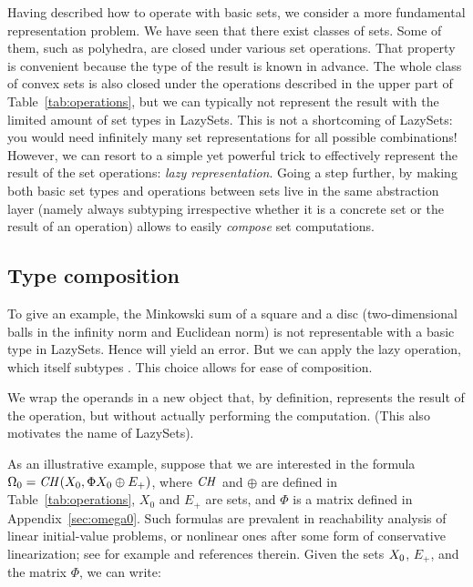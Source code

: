 Having described how to operate with basic sets, we consider a more fundamental representation problem.
%
We have seen that there exist classes of sets.
Some of them, such as polyhedra, are closed under various set operations. That property is convenient because the type of the result is known in advance.
%
The whole class of convex sets is also closed under the operations described in the upper part of Table~\ref{tab:operations}, but we can typically not represent the result with the limited amount of set types in LazySets. This is not a shortcoming of LazySets: you would need infinitely many set representations for all possible combinations! However, we can resort to a simple yet powerful trick to effectively represent the result of the set operations: \emph{lazy representation}.
%
Going a step further, by making both basic set types and operations between sets live in the same abstraction layer (namely always subtyping  irrespective whether it is a concrete set or the result of an operation) allows to easily \emph{compose} set computations.


\subsection{Type composition} \label{sec:composition}

To give an example, the Minkowski sum of a square and a disc (two-dimensional balls in the infinity norm and Euclidean norm) is not representable with a basic type in LazySets. Hence  will yield an error. But we can apply the lazy  operation, which itself subtypes . This choice allows for ease of composition.

We wrap the operands in a new object that, by definition, represents the result of the operation, but without actually performing the computation. (This also motivates the name of LazySets).

\smallskip

As an illustrative example, suppose that we are interested in the formula $\Omega_0 = \mathit{CH}(X_0, \Phi X_0 \oplus E_+)$, where $\mathit{CH}$ and $\oplus$ are defined in Table~\ref{tab:operations}, $X_0$ and $E_+$ are sets, and $\Phi$ is a matrix defined in Appendix~\ref{sec:omega0}. Such formulas are prevalent in reachability analysis of linear initial-value problems, or nonlinear ones after some form of conservative linearization; see for example \cite{althoff2020set} and references therein. Given the sets $X_0$, $E_+$, and the matrix $\Phi$, we can write:

